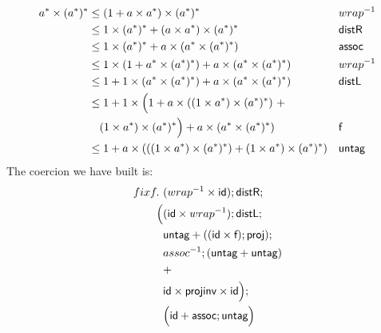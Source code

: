 \documentclass[a4paper,UKenglish,cleveref, autoref, thm-restate]{lipics-v2021}
\begin{document}
\begin{align}
a^* \times \dstar{a} &\leq (1 + a \times a^*) \times \dstar{a}  &&\dslcominv{wrap}  \\
                     &\leq 1 \times \dstar{a} + (a \times a^* ) \times \dstar{a} &&\dslcom{distR}\\
                     &\leq 1 \times \dstar{a} +  a \times (a^*  \times \dstar{a}) && \dslcom{assoc} \\
                     &\leq 1 \times (1 + a^* \times \dstar{a}) +  a \times (a^*  \times \dstar{a})&& \dslcominv{wrap} \\
                     &\leq 1 + 1 \times (a^* \times \dstar{a}) +  a \times (a^*  \times \dstar{a})&&\dslcom{distL}\\
                     &\leq 1 + 1\times \Big( 1 + a \times ((1 \times a^*) \times \dstar a)~+\\
                     &\quad(1 \times a^*) \times \dstar a\Big)  + a \times (a^*  \times \dstar{a}) && \dslcom{f} \\
                     &\leq 1 + a \times (((1 \times a^*) \times \dstar a) + (1 \times a^*) \times \dstar a) && \dslcom{untag}
\end{align}
The coercion we have built is:
\begin{align}
\fix f.~&(\dslcominv{wrap} \times \dslcom{id});\dslcom{distR};\\
 \Big( &(\dslcom{id} \times \dslcominv{wrap});\dslcom{distL};\\
       &\dslcom{untag} + ((\dslcom{id} \times \dslcom{f});\dslcom{proj});\\
       &\dslcominv{assoc};(\dslcom{untag} + \dslcom{untag}) \\
&+\\
 &\dslcom{id} \times \dslcom{projinv} \times \dslcom{id} \Big);\\
 & \Big(\dslcom{id} + \dslcom{assoc} ; \dslcom{untag} \Big)
\end{align}
\end{document}
